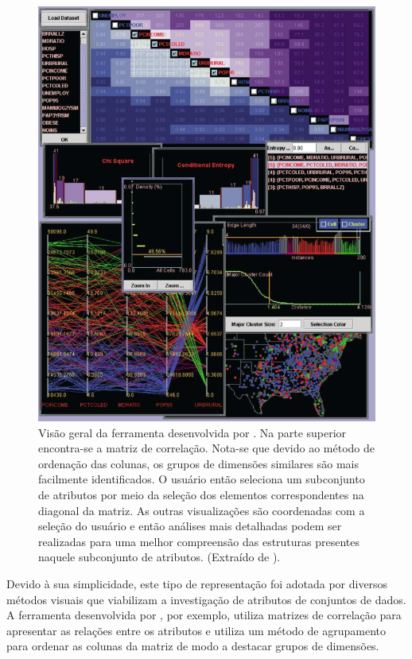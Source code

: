 \begin{figure}[h!]
    \centering
    \includegraphics[width=12cm]{images/coord.png}
    \caption[Ferramenta proposta por \cite{Guo2003}]
    {Visão geral da ferramenta desenvolvida por
    \cite{Guo2003}. Na parte superior encontra-se a matriz
de correlação. Nota-se que devido ao método de ordenação das
colunas, os grupos de dimensões similares são mais
facilmente identificados. O usuário então seleciona um
subconjunto de atributos por meio da seleção dos elementos
correspondentes na diagonal da matriz. As outras
visualizações são coordenadas com a seleção do usuário e
então análises mais detalhadas podem ser realizadas para uma
melhor compreensão das estruturas presentes naquele
subconjunto de atributos. (Extraído de \cite{Guo2003}).} 
    \label{fig:coord}
\end{figure}


Devido à sua simplicidade, este tipo de representação foi
adotada por diversos métodos visuais que viabilizam a
investigação de atributos de conjuntos de dados. A
ferramenta desenvolvida por
\cite{Guo2003}, por exemplo, utiliza matrizes de correlação
para apresentar as relações entre os atributos e utiliza um
método de agrupamento para ordenar as colunas da matriz de
modo a destacar grupos de dimensões.

